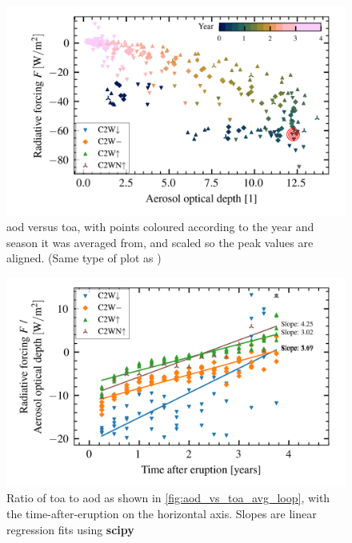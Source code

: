 \documentclass[twocol]{ametsocV5}
\begin{document}
\begin{figure}
  \begin{center}
    \includegraphics[width=0.95\linewidth]{figures/aod_vs_toa_avg_loop_scaled.png}
  \end{center}
  \caption{
    \acrshort{aod} versus \acrshort{toa}, with points coloured according to the year and
    season it was averaged from, and scaled so the peak values are aligned. (Same type
    of plot as \citet{gregory2016})
  }%
  \label{fig:aod_vs_toa_avg_loop_scaled}
\end{figure}

\begin{figure}
  \begin{center}
    \includegraphics[width=0.95\linewidth]{figures/aod_vs_toa_avg_loop_ratio.png}
  \end{center}
  \caption{
    Ratio of \acrshort{toa} to \acrshort{aod} as shown in
    \cref{fig:aod_vs_toa_avg_loop}, with the time-after-eruption on the horizontal axis.
    Slopes are linear regression fits using \textbf{scipy}
  }%
  \label{fig:aod_vs_toa_avg_loop_ratio}
\end{figure}
\end{document}
